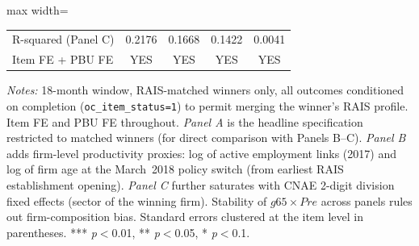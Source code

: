 \begin{table}[htbp]
\begin{adjustbox}{max width=\textwidth}
\begin{threeparttable}
\begin{tabular}{lcccc}
R-squared (Panel C) & 0.2176 & 0.1668 & 0.1422 & 0.0041 \\
Item FE + PBU FE & YES & YES & YES & YES \\
\bottomrule
\end{tabular}
\begin{tablenotes}
\small
\item \textit{Notes:} 18-month window, RAIS-matched winners only, all
outcomes conditioned on completion (\texttt{oc\_item\_status=1}) to
permit merging the winner's RAIS profile. Item FE and PBU FE throughout.
\textit{Panel A} is the headline specification restricted to matched
winners (for direct comparison with Panels B--C). \textit{Panel B} adds
firm-level productivity proxies: log of active employment links (2017) and
log of firm age at the March~2018 policy switch (from earliest RAIS
establishment opening). \textit{Panel C} further saturates with CNAE 2-digit
division fixed effects (sector of the winning firm).
Stability of $g65 \times Pre$ across panels rules out firm-composition bias.
Standard errors clustered at the item level in parentheses.
*** \textit{p}$<$0.01, ** \textit{p}$<$0.05, * \textit{p}$<$0.1.
\end{tablenotes}
\end{threeparttable}
\end{adjustbox}
\end{table}
